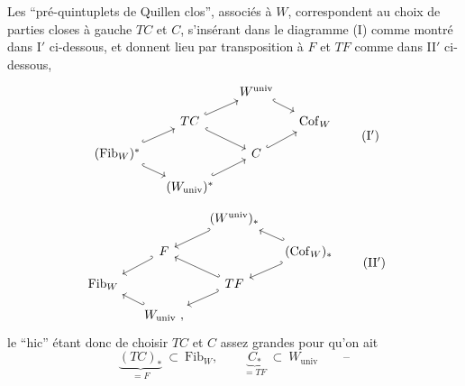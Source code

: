 \documentclass[11pt]{article}
\newcommand{\Cof}{\mathrm{Cof}}
\newcommand{\Fib}{\mathrm{Fib}}
\newcommand{\univ}{\mathrm{univ}}
\begin{document}
Les “pré-quintuplets de Quillen clos”, associés à $W$, correspondent au choix de parties closes à gauche $TC$ et $C$, s'insérant dans le diagramme (I) comme montré dans I$'$ ci-dessous, et donnent lieu par transposition à $F$ et $TF$ comme dans II$'$ ci-dessous,
\[
\begin{tikzcd}[column sep=small, row sep=small]
 & & W^{\univ} \arrow[dr, hook] & \\
 & TC \arrow[ur, hook] \arrow[dr, hook] & & \Cof_W \\
(\Fib_W)^* \arrow[ur, hook] \arrow[dr, hook] & & C \arrow[ur, hook] & \\
 & (W_{\univ})^* \arrow[ur, hook] & &
\end{tikzcd}
\tag*{(I$'$)}
\]
\[
\begin{tikzcd}[column sep=small, row sep=small]
 & & (W^{\univ})_* \arrow[dl, hook'] & \\
 & F \arrow[dl, hook'] & & (\Cof_W)_* \arrow[ul, hook'] \arrow[dl, hook'] \\
\Fib_W & & TF \arrow[ul, hook'] \arrow[dl, hook'] & \\
 & W_{\univ}\ , \arrow[ul, hook'] & &
\end{tikzcd}
\tag*{(II$'$)}
\]
le “hic” étant donc de choisir $TC$ et $C$ assez grandes pour qu'on ait
\[ \underbrace{(TC)_*}_{= F} \ \subset\ \Fib_W, \qquad \underbrace{C_*}_{= TF} \ \subset\ W_{\univ} \qquad \text{--} \]
\end{document}
